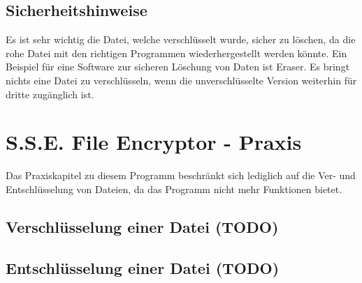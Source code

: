 \documentclass[12pt,a4paper]{scrreprt}
\begin{document}
\section{Sicherheitshinweise}
Es ist sehr wichtig die Datei, welche verschlüsselt wurde, sicher zu löschen, da die rohe Datei mit den richtigen Programmen wiederhergestellt werden könnte. Ein Beispiel für eine Software zur sicheren Löschung von Daten ist Eraser. Es bringt nichts eine Datei zu verschlüsseln, wenn die unverschlüsselte Version weiterhin für dritte zugänglich ist.

\chapter{S.S.E. File Encryptor - Praxis}
Das Praxiskapitel zu diesem Programm beschränkt sich lediglich auf die Ver- und Entschlüsselung von Dateien, da das Programm nicht mehr Funktionen bietet.

\section{Verschlüsselung einer Datei (TODO)}

\section{Entschlüsselung einer Datei (TODO)}
\end{document}
